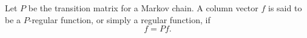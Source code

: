 Let $P$ be the transition matrix for a Markov chain. A column vector $f$ is said to be a $P$-regular function, or simply a regular function, if
$$f = Pf.$$
